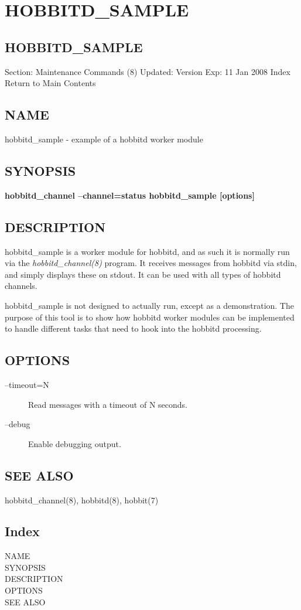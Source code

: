 \chapter{HOBBITD\_SAMPLE}

\section{HOBBITD\_SAMPLE}
 Section: Maintenance Commands (8) 
Updated: Version Exp: 11 Jan 2008 
Index Return to Main Contents
\section{NAME}
 hobbitd\_sample - example of a hobbitd worker module \section{SYNOPSIS}
\textbf{hobbitd\_channel --channel=status hobbitd\_sample [options]}


 
\section{DESCRIPTION}
 hobbitd\_sample is a worker module for hobbitd, and as such it is normally run via the \emph{hobbitd\_channel(8)}
 program. It receives messages from hobbitd via stdin, and simply displays these on stdout. It can be used with all types of hobbitd channels. 

  hobbitd\_sample is not designed to actually run, except as a demonstration. The purpose of this tool is to show how hobbitd worker modules can be implemented to handle different tasks that need to hook into the hobbitd processing. 


 
\section{OPTIONS}
\begin{description}
\item[--timeout=N] Read messages with a timeout of N seconds. 

 

\item[--debug] Enable debugging output. 

 


\end{description}
\section{SEE ALSO}
hobbitd\_channel(8), hobbitd(8), hobbit(7) 



\section{Index}
\begin{description}
\item[NAME]
\item[SYNOPSIS]
\item[DESCRIPTION]
\item[OPTIONS]
\item[SEE ALSO]

\end{description}


